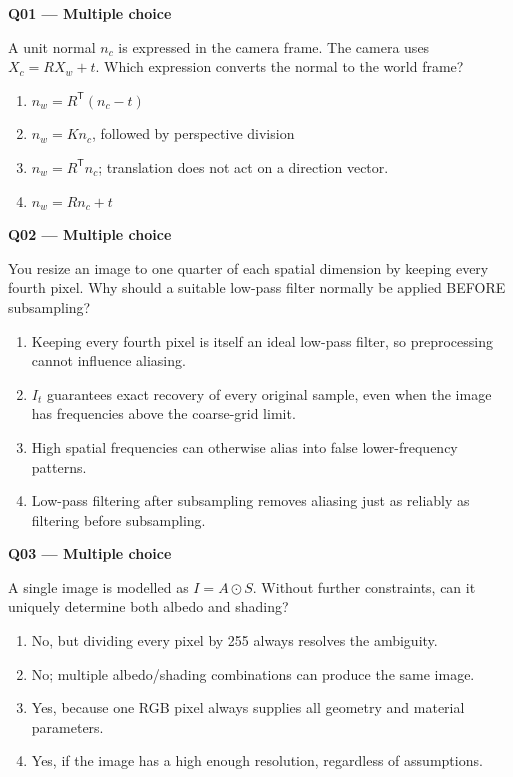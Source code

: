 \documentclass[11pt,a4paper]{article}
\begin{document}
\begin{minipage}{\linewidth}
\textbf{Q01 — Multiple choice}\par\smallskip
A unit normal \(n_c\) is expressed in the camera frame. The camera uses \(X_c=R X_w+t\). Which expression converts the normal to the world frame?
\begin{enumerate}[label=\textbf{\Alph*.}]
\item \(n_w=R^{\mathsf T}(n_c-t)\)
\item \(n_w=Kn_c\),\allowbreak{} followed by perspective division
\item \(n_w=R^{\mathsf T}n_c\); translation does not act on a direction vector.
\item \(n_w=Rn_c+t\)
\end{enumerate}
\end{minipage}
\par\vspace{12pt}
\begin{minipage}{\linewidth}
\textbf{Q02 — Multiple choice}\par\smallskip
You resize an image to one quarter of each spatial dimension by keeping every fourth pixel. Why should a suitable low-pass filter normally be applied BEFORE subsampling?
\begin{enumerate}[label=\textbf{\Alph*.}]
\item Keeping every fourth pixel is itself an ideal low-pass filter,\allowbreak{} so preprocessing cannot influence aliasing.
\item \(I_t\) guarantees exact recovery of every original sample,\allowbreak{} even when the image has frequencies above the coarse-grid limit.
\item High spatial frequencies can otherwise alias into false lower-frequency patterns.
\item Low-pass filtering after subsampling removes aliasing just as reliably as filtering before subsampling.
\end{enumerate}
\end{minipage}
\par\vspace{12pt}
\begin{minipage}{\linewidth}
\textbf{Q03 — Multiple choice}\par\smallskip
A single image is modelled as \(I=A\odot S\). Without further constraints,\allowbreak{} can it uniquely determine both albedo and shading?
\begin{enumerate}[label=\textbf{\Alph*.}]
\item No,\allowbreak{} but dividing every pixel by 255 always resolves the ambiguity.
\item No; multiple albedo/\allowbreak{}shading combinations can produce the same image.
\item Yes,\allowbreak{} because one RGB pixel always supplies all geometry and material parameters.
\item Yes,\allowbreak{} if the image has a high enough resolution,\allowbreak{} regardless of assumptions.
\end{enumerate}
\end{minipage}
\end{document}
